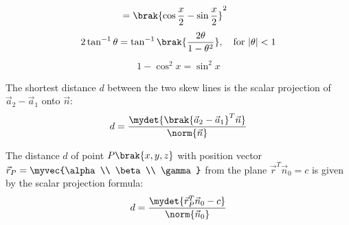 \begin{enumerate}[label=\thesubsection.\arabic*, ref=\thesubsection.\theenumi]
\begin{align}
	\\
	&= \brak{\cos\frac{x}{2} - \sin\frac{x}{2}}^2
	\label{eq:EE26BTECH11202-minus_sin_decomp}
\end{align}
\begin{align}
	2\tan^{-1}\theta = \tan^{-1}\brak{\frac{2\theta}{1 - \theta^2}}, \quad \text{for } |\theta| < 1
	\label{eq:EE26BTECH11202-double_angle_identity}
\end{align}
\begin{align}
   1 - \cos^2 x = \sin^2 x \label{eq:pythogorus}
	\end{align}

	The shortest distance $d$ between the two skew lines is the scalar projection of $\vec{a}_2 - \vec{a}_1$ onto $\vec{n}$:
	\begin{align}
		d = \frac{\mydet{\brak{\vec{a}_2 - \vec{a}_1}^T \vec{n}}}{\norm{\vec{n}}} \label{shortest_distance}
	\end{align}
	
	The distance $d$ of point $P\brak{x, y, z}$ with position vector $\vec{r}_P = \myvec{\alpha \\ \beta \\ \gamma}$ from the plane $\vec{r}^T \vec{n}_0 = c$ is given by the scalar projection formula:
	\begin{align}
		d = \frac{\mydet{\vec{r}_P^T \vec{n}_0 - c}}{\norm{\vec{n}_0}} \label{eq:per_dis}
	\end{align}
	

\end{enumerate}
